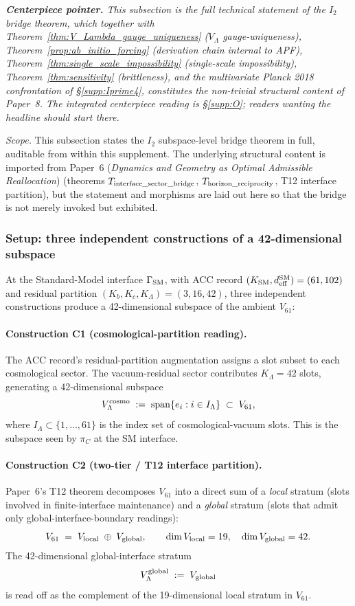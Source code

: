 \documentclass[11pt]{article}
\theoremstyle{plain}
\theoremstyle{definition}
\theoremstyle{remark}
\newcommand{\paperref}[2]{Paper~#1 (\emph{#2})}
\begin{document}
\noindent\textit{\textbf{Centerpiece pointer.}  This subsection is the full technical statement of the $I_2$ bridge theorem, which together with Theorem~\ref{thm:V_Lambda_gauge_uniqueness} ($V_\Lambda$ gauge-uniqueness), Theorem~\ref{prop:ab_initio_forcing} (derivation chain internal to APF), Theorem~\ref{thm:single_scale_impossibility} (single-scale impossibility), Theorem~\ref{thm:sensitivity} (brittleness), and the multivariate Planck 2018 confrontation of \S\ref{supp:Iprime4}, constitutes the non-trivial structural content of Paper~8.  The integrated centerpiece reading is \S\ref{supp:O}; readers wanting the headline should start there.}

\noindent\textit{Scope.}  This subsection states the $I_2$ subspace-level bridge theorem in full, auditable from within this supplement.  The underlying structural content is imported from \paperref{6}{Dynamics and Geometry as Optimal Admissible Reallocation} (theorems $T_{\rm interface\_sector\_bridge}$, $T_{\rm horizon\_reciprocity}$, T12 interface partition), but the statement and morphisms are laid out here so that the bridge is not merely invoked but exhibited.

\subsubsection*{Setup: three independent constructions of a 42-dimensional subspace}

At the Standard-Model interface $\Gamma_{\rm SM}$, with ACC record $(K_{\rm SM}, d_{\rm eff}^{\rm SM}) = (61, 102)$ and residual partition $(K_b, K_c, K_\Lambda) = (3, 16, 42)$, three independent constructions produce a 42-dimensional subspace of the ambient $V_{61}$:

\paragraph{Construction C1 (cosmological-partition reading).}
The ACC record's residual-partition augmentation assigns a slot subset to each cosmological sector.  The vacuum-residual sector contributes $K_\Lambda = 42$ slots, generating a 42-dimensional subspace
\[
  V_\Lambda^{\rm cosmo} \;:=\; \mathrm{span}\{ e_i : i \in I_\Lambda \} \;\subset\; V_{61},
\]
where $I_\Lambda \subset \{1, \dots, 61\}$ is the index set of cosmological-vacuum slots.  This is the subspace seen by $\pi_C$ at the SM interface.

\paragraph{Construction C2 (two-tier / T12 interface partition).}
Paper~6's T12 theorem decomposes $V_{61}$ into a direct sum of a \emph{local} stratum (slots involved in finite-interface maintenance) and a \emph{global} stratum (slots that admit only global-interface-boundary readings):
\[
  V_{61} \;=\; V_{\rm local} \;\oplus\; V_{\rm global},
  \qquad
  \dim V_{\rm local} = 19,
  \quad
  \dim V_{\rm global} = 42.
\]
The 42-dimensional global-interface stratum
\[
  V_\Lambda^{\rm global} \;:=\; V_{\rm global}
\]
is read off as the complement of the 19-dimensional local stratum in $V_{61}$.
\end{document}
